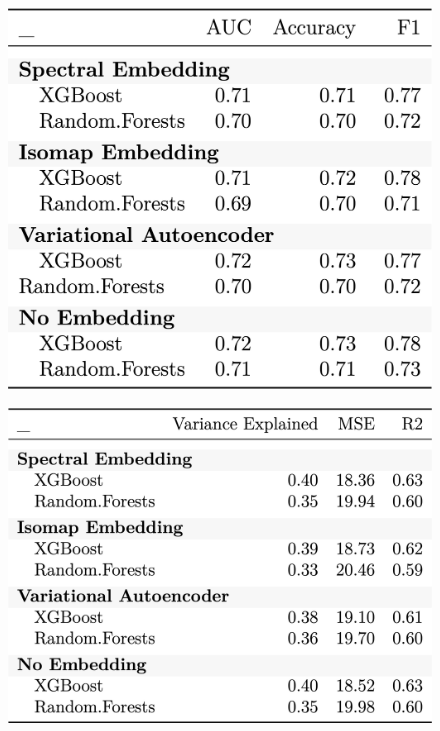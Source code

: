 \documentclass{article} %
\begin{document}
\begin{figure}[h]
\begin{center}
\includegraphics[scale=0.22]{../Figures/binary.png} 
\end{center}
\end{figure}

\begin{figure}[h]
\begin{center}
\includegraphics[scale=0.22]{../Figures/regression.png} 
\end{center}
\end{figure}
\end{document}
